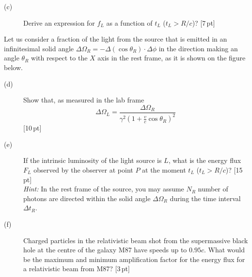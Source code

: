 \begin{description}
\item[(c)] Derive an expression for $f_L$ as a function of $t_L$
  ($t_L > R/c$)? \hfill[7\,pt]
\end{description}

Let us consider a fraction of the light from the source that is emitted in an
infinitesimal solid angle
$\Delta\Omega_R = -\Delta(\cos\theta_R) \cdot \Delta\phi$ in the direction
making an angle $\theta_R$ with respect to the $X$ axis in the rest frame, as
it is shown on the figure below.


\begin{description}
\item[(d)] Show that, as measured in the lab frame
  \[ \Delta\Omega_L = \frac{\Delta\Omega_R}
     {\gamma^2\left(1 + \frac{v}{c}\cos\theta_R\right)^2} \]
  \hfill[10\,pt]
\item[(e)] If the intrinsic luminosity of the light source is $L$, what is the
  energy flux $F_L$ observed by the observer at point $P$ at the moment $t_L$
  ($t_L > R/c$)? \hfill[15\,pt]\\
  \textit{Hint:} In the rest frame of the source, you may assume $N_R$ number
  of photons are directed within the solid angle $\Delta\Omega_R$ during the
  time interval $\Delta t_R$.
\item[(f)] Charged particles in the relativistic beam shot from the
  supermassive black hole at the centre of the galaxy M87 have speeds up to
  $0.95c$. What would be the maximum and minimum amplification factor for the
  energy flux for a relativistic beam from M87? \hfill[3\,pt]
\end{description}
